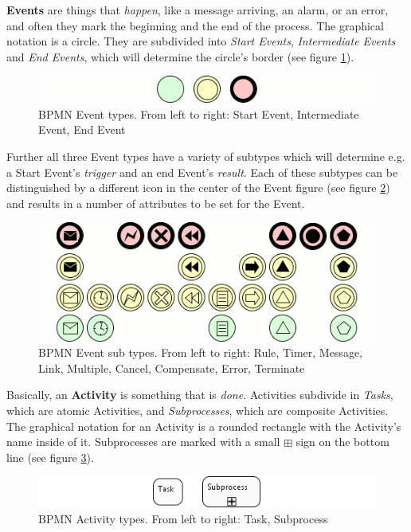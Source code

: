 \textbf{Events} are things that \emph{happen}, like a message arriving, an alarm, or an error, and often they mark the beginning and the end of the process. The graphical notation is a circle. They are subdivided into \emph{Start Events}, \emph{Intermediate Events} and \emph{End Events}, which will determine the circle's border (see figure \ref{fig:events}).

\begin{figure}[htp]
	\centering
	\includegraphics[width=.75\textwidth]{figures/bpmn/events.png}
	\caption[BPMN Event types]{BPMN Event types. From left to right: Start Event, Intermediate Event, End Event}
	\label{fig:events}
\end{figure}

Further all three Event types have a variety of subtypes which will determine e.g. a Start Event's \emph{trigger} and an end Event's \emph{result}. Each of these subtypes can be distinguished by a different icon in the center of the Event figure (see figure \ref{fig:triggers}) and results in a number of attributes to be set for the Event.

\begin{figure}[htp]
	\centering
	\includegraphics[width=.75\textwidth]{figures/bpmn/triggers.png}
	\caption[BPMN Event sub types]{BPMN Event sub types. From left to right: Rule, Timer, Message, Link, Multiple, Cancel, Compensate, Error, Terminate}
	\label{fig:triggers}
\end{figure}

Basically, an \textbf{Activity} is something that is \emph{done}. Activities subdivide in \emph{Tasks}, which are atomic Activities, and \emph{Subprocesses}, which are composite Activities. The graphical notation for an Activity is a rounded rectangle with the Activity's name inside of it. Subprocesses are marked with a small $ \boxplus $ sign on the bottom line (see figure \ref{fig:activities}).

\begin{figure}[htp]
	\centering
	\includegraphics[width=.75\textwidth]{figures/bpmn/activities.png}
	\caption[BPMN Activity types]{BPMN Activity types. From left to right: Task, Subprocess}
	\label{fig:activities}
\end{figure}

